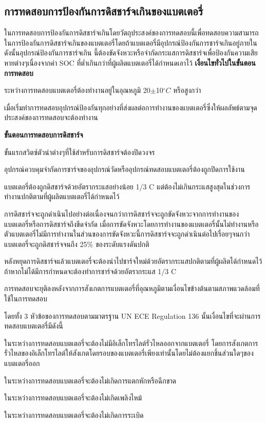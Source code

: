 \subsection{การทดสอบการป้องกันการดิสชาร์จเกินของแบตเตอรี่}
ในการทดสอบการป้องกันการดิสชาร์จเกินโดยวัตถุประสงค์ของการทดสอบนี้เพื่อทดสอบความสามารถในการป้องกันการดิสชาร์จเกินของแบตเตอรี่โดยถ้าแบตเตอรี่มีอุปกรณ์ป้องกันการชาร์จเกินอยู่ภายในดังนั้นอุปกรณ์ป้องกันการชาร์จเกิน
นี้ต้องขัดจังหวะหรือจำกัดกระแสการดิสชาร์จเพื่อป้องกันความเสียหายต่างๆเนื่องจากค่า SOC ที่ต่ำเกินกว่าที่ผู้ผลิตแบตเตอรี่ได้กำหนดเอาไว้
\newline
\newline
\textbf{เงื่อนไขทั่วไปในขั้นตอนการทดสอบ}
\begin{itemize}
{\item ระหว่างการทดสอบแบตเตอรี่ต้องทำงานอยู่ในอุณหภูมิ 20$\pm$10$^{\circ}C$ หรือสูงกว่า}
{\item เมื่อเริ่มทำการทดสอบอุปกรณ์ป้องกันทุกอย่างที่ส่งผลต่อการทำงานของแบตเตอรี่ซึ่งให้ผลลัพธ์ตามจุดประสงค์ของการทดสอบจะต้องทำงาน}
\end{itemize}
\textbf{ขั้นตอนการทดสอบการดิสชาร์จ}
\begin{itemize}
{\item ขั้นแรกสวิตซ์ตัวนำต่างๆที่ใช้สำหรับการดิสชาร์จต้องปิดวงจร}
{\item อุปกรณ์ควบคุมจำกัดการชาร์จของอุปกรณ์วัดหรืออุปกรณ์ทดสอบแบตเตอรี่ต้องถูกปิดการใช้งาน}
{\item แบตเตอรี่ต้องถูกดิสชาร์จด้วยอัตรากระแสอย่างน้อย 1/3 C แต่ต้องไม่เกินกระแสสูงสุดในช่วงการทำงานปกติตามที่ผู้ผลิตแบตเตอรี่ได้กำหนดไว้}
{\item การดิสชาร์จจะถูกดำเนินไปอย่างต่อเนื่องจนกว่าการดิสชาร์จจะถูกขัดจังหวะจากการทำงานของแบตเตอรี่หรือการดิสชาร์จถึงขีดจำกัด เมื่อการขัดจังหวะโดยการทำงานของแบตเตอรี่นั้นไม่ทำงานหรือตัวแบตเตอรี่ไม่มีการทำงานในส่วนของการขัดจังหวะนี้การดิสชาร์จจะถูกดำเนินต่อไปเรื่อยๆจนกว่าแบตเตอรี่จะถูกดิสชาร์จจนถึง 25\% ของระดับแรงดันปกติ}
{\item หลังหยุดการดิสชาร์จแล้วแบตเตอรี่จะต้องนำไปชาร์จใหม่ด้วยอัตรากระแสปกติตามที่ผู้ผลิตได้กำหนดไว้ถ้าหากไม่ได้มีการกำหนดจะต้องทำการชาร์จด้วยอัตรากระแส 1/3 C}
{\item การทดสอบจะยุติลงหลังจากการสังเกตการแบตเตอรี่ที่อุณหภูมิตามเงื่อนไขข้างต้นตามสภาพแวดล้อมที่ใช้ในการทดสอบ}
\end{itemize}
โดยทั้ง 3 หัวข้อของการทดสอบตามมาตรฐาน UN ECE Regulation 136 นั้นเงื่อนไขที่จะผ่านการทดสอบแบตเตอรี่มีดังนี้
\begin{enumerate}
{\item ในระหว่างการทดสอบแบตเตอรี่จะต้องไม่มีอิเล็กโทรไลต์รั่วไหลออกจากแบตเตอรี่ โดยการสังเกตการรั่วไหลของอิเล็กโทรไลต์ให้สังเกตโดยรอบของแบตเตอรี่เพียงเท่านั้นโดยไม่ต้องแยกชิ้นส่วนใดๆของแบตเตอรี่ออก}
{\item ในระหว่างการทดสอบแบตเตอรี่จะต้องไม่เกิดการแตกหักหรือฉีกขาด}
{\item ในระหว่างการทดสอบแบตเตอรี่จะต้องไม่เกิดเพลิงไหม้}
{\item ในระหว่างการทดสอบแบตเตอรี่จะต้องไม่เกิดการระเบิด}
\end{enumerate}
